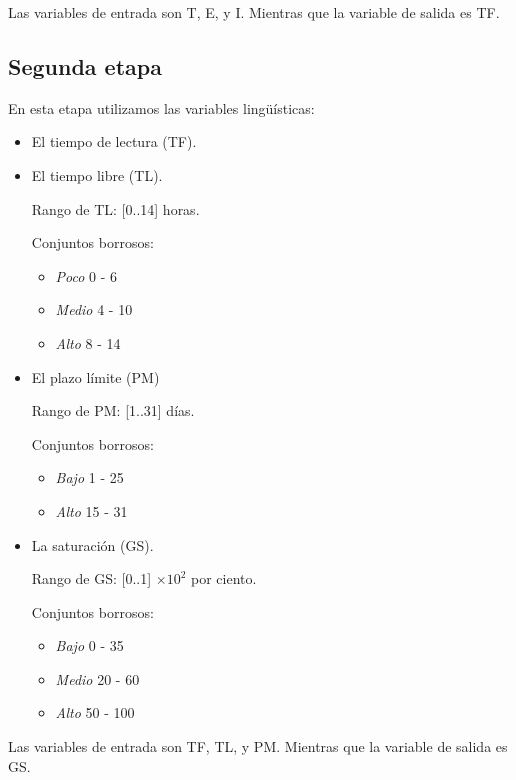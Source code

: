 \documentclass[a4paper, 8pt]{article}
\begin{document}
Las variables de entrada son T, E, y I.
Mientras que la variable de salida es TF.  

\subsection{Segunda etapa}

En esta etapa utilizamos las variables lingüísticas:

\begin{itemize}
\item El tiempo de lectura (TF).

\item El tiempo libre (TL).

  Rango de TL: [0..14] horas.
    
  Conjuntos borrosos:
    
  \begin{itemize}
        \item \textit{Poco} 0 - 6
        \item \textit{Medio} 4 - 10
        \item \textit{Alto} 8 - 14
  \end{itemize}
        
\item El plazo límite (PM)

  Rango de PM: [1..31] días.

  Conjuntos borrosos:
  
  \begin{itemize}
        \item \textit{Bajo} 1 - 25
        \item \textit{Alto} 15 - 31
  \end{itemize}
  
\item La saturación (GS).

  Rango de GS: [0..1] $\times 10^2$ por ciento.

  Conjuntos borrosos:
  
  \begin{itemize}
        \item \textit{Bajo} 0 - 35
        \item \textit{Medio} 20 - 60
        \item \textit{Alto} 50 - 100
  \end{itemize}
\end{itemize}

Las variables de entrada son TF, TL, y PM.
Mientras que la variable de salida es GS.  
\end{document}
